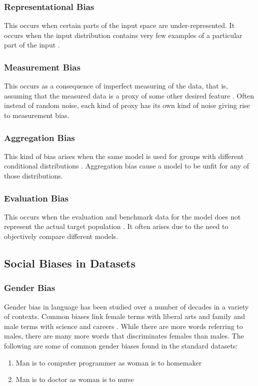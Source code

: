 \documentclass[12pt, a4paper]{article}
\begin{document}
			\subsubsection{Representational Bias} 
				This occurs when certain parts of the input space are under-represented. It occurs when the input distribution contains very few examples of a particular part of the input \cite{8}.
				
			\subsubsection{Measurement Bias}
				This occurs as a consequence of imperfect measuring of the data, that is, assuming that the measured data is a proxy of some other desired feature \cite{8}. Often instead of random noise, each kind of proxy has its own kind of noise giving rise to measurement bias.
				
			\subsubsection{Aggregation Bias}
				This kind of bias arises when the same model is used for groups with different conditional distributions \cite{8}. Aggregation bias cause a model to be unfit for any of those distributions.
				
			\subsubsection{Evaluation Bias}
				This occurs when the evaluation and benchmark data for the model does not represent the actual target population \cite{8}. It often arises due to the need to objectively compare different models.
			
		\subsection {Social Biases in Datasets}
		
			\subsubsection{Gender Bias}
				Gender bias in language has been studied over a number of decades in a variety of contexts. Common biases link female terms with liberal arts and family and male terms with science and careers \cite{3}. While there are more words referring to males, there are many more words that discriminates females than males. The following are some of common gender biases found in the standard datasets:
				\begin{enumerate}
					\item Man is to computer programmer as woman is to homemaker
					\item Man is to doctor as woman is to nurse
				\end{enumerate}
				
\end{document}
